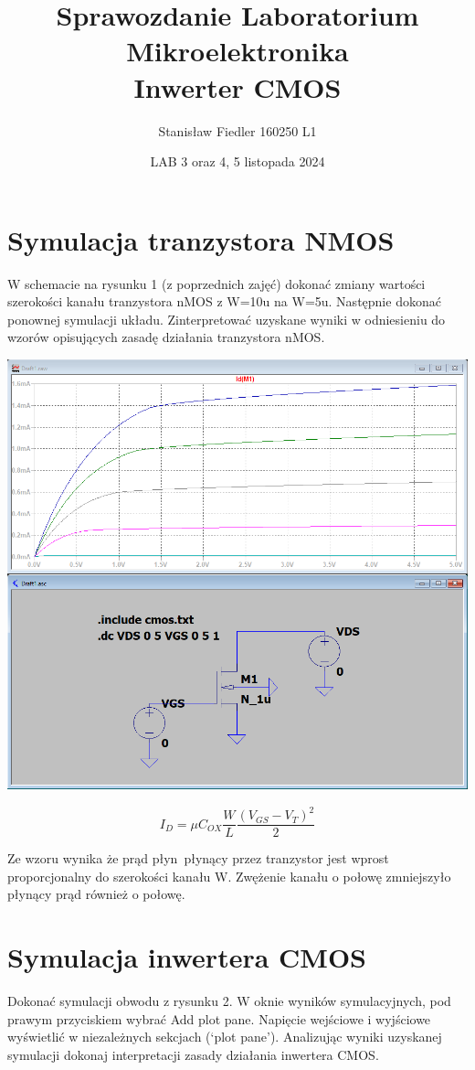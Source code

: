 \documentclass[a4paper, 11pt]{article}
\title{%
       \large Sprawozdanie Laboratorium Mikroelektronika \\
       \huge  Inwerter CMOS}
\author{Stanisław Fiedler 160250 L1}
\date{LAB 3 oraz 4, 5 listopada 2024}
\begin{document}
\maketitle
\tableofcontents

\section{Symulacja tranzystora NMOS}\label{sec:symulacja_tranzystora_nmos} %
W schemacie na rysunku 1 (z poprzednich zajęć) dokonać zmiany wartości szerokości kanału tranzystora
nMOS z W=10u na W=5u. Następnie dokonać ponownej symulacji układu. Zinterpretować uzyskane wyniki w
odniesieniu do wzorów opisujących zasadę działania tranzystora nMOS.

\begin{center}
	\includegraphics[scale=0.4]{mikro_lab3/Przechwytywanie.PNG}
\end{center}

\[
	I_D = \mu C_{OX} \frac{W}{L} \frac{\left( V_{GS} - V_{T} \right)^2}{2}
\]

Ze wzoru wynika że prąd płyn płynący przez tranzystor jest wprost proporcjonalny do szerokości kanału W. Zwężenie kanału o połowę zmniejszyło płynący prąd również o połowę.


\section{Symulacja inwertera CMOS}\label{sec:symulacja_inwertera_cmos} %
Dokonać symulacji obwodu z rysunku 2. W oknie wyników symulacyjnych, pod prawym przyciskiem
wybrać Add plot pane. Napięcie wejściowe i wyjściowe wyświetlić w niezależnych sekcjach (‘plot pane’). Analizując
wyniki uzyskanej symulacji dokonaj interpretacji zasady działania inwertera CMOS.
\end{document}
